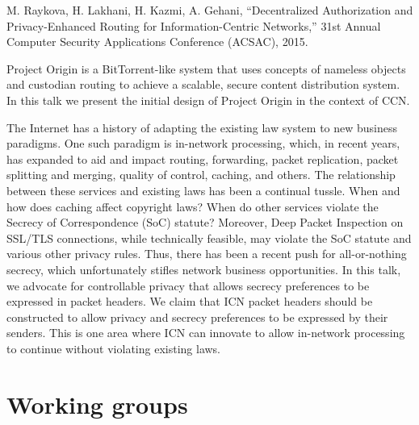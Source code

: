 \documentclass[a4paper,UKenglish]{dagrep}
\begin{document}
\begin{thebibliography}{0}
\bibitem{[1]} M. Raykova, H. Lakhani, H. Kazmi, A. Gehani, ``Decentralized Authorization and Privacy-Enhanced Routing for Information-Centric Networks,'' 31st Annual Computer Security Applications Conference (ACSAC), 2015.
\end{thebibliography}

\license

Project Origin is a BitTorrent-like system that uses concepts of nameless objects and custodian routing to achieve a scalable, secure content distribution system. In this talk we present the initial design of Project Origin in the context of CCN.

\license

The Internet has a history of adapting the existing law system to new business paradigms.
One such paradigm is in-network processing, which, in recent years, has expanded to
aid and impact routing, forwarding, packet replication, packet splitting and merging,
quality of control, caching, and others. The relationship between these services and
existing laws has been a continual tussle. When and how does caching affect copyright laws?
When do other services violate the Secrecy of Correspondence (SoC) statute?
Moreover, Deep Packet Inspection on SSL/TLS connections, while technically feasible, may violate
the SoC statute and various other privacy rules. Thus, there has been a recent push for
all-or-nothing secrecy, which unfortunately stifles network business opportunities.
In this talk, we advocate for controllable privacy that allows secrecy preferences to be
expressed in packet headers. We claim that ICN packet headers should be constructed to allow
privacy and secrecy preferences to be expressed by their senders. This is one area where ICN
can innovate to allow in-network processing to continue without violating existing laws.


\section{Working groups}

\license
\end{document}
